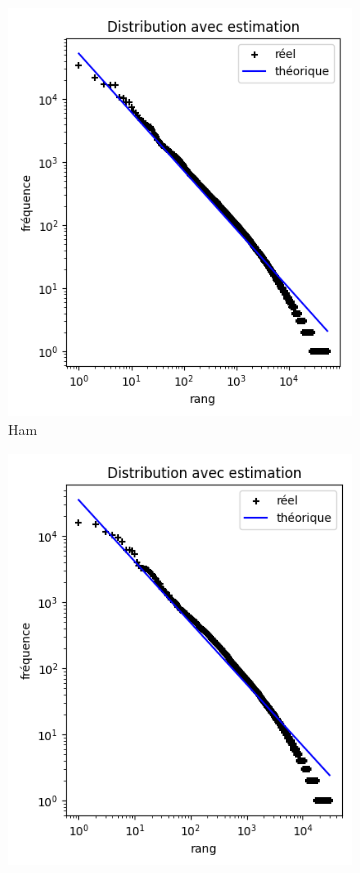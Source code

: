 \documentclass[a4paper,12pt]{article}
\begin{document}
\begin{figure}[H]
\begin{subfigure}[b]{0.3\linewidth}
    					\includegraphics[width=\linewidth]{img/zipfHam.png}
    					\caption{Ham}
  				\end{subfigure}
  				\begin{subfigure}[b]{0.3\linewidth}
  					\includegraphics[width=\linewidth]{img/zipfSpam.png}

\end{subfigure}
\end{figure}
\end{document}

